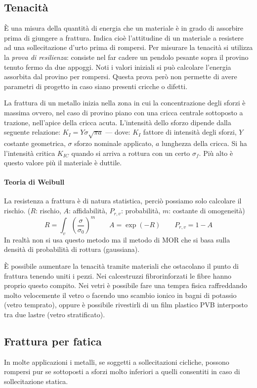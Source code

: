 \documentclass[a5paper,12pt]{article}
\newcommand{\e}{\`E\xspace}  %
\begin{document}
\subsection{Tenacità}
\e una misura della quantità di energia che un materiale è in grado di assorbire prima di giungere a frattura. Indica cioè l'attitudine di un materiale a resistere ad 	una sollecitazione d'urto prima di rompersi. Per misurare la tenacità si utilizza la \emph{prova di resilienza}: consiste nel far cadere un pendolo pesante sopra il provino tenuto fermo da due appoggi. Noti i valori iniziali si può calcolare l'energia assorbita dal provino per rompersi. Questa prova però non permette di avere parametri di progetto in caso siano presenti cricche o difetti. 

La frattura di un metallo inizia nella zona in cui la concentrazione degli sforzi è massima ovvero, nel caso di provino piano con una cricca centrale sottoposto a trazione, nell'apice della cricca acuta. L'intensità dello sforzo dipende dalla seguente relazione: $K_I = Y \sigma \sqrt{\pi a} $ --- dove: $K_I$ fattore di intensità degli sforzi, $Y$ costante geometrica, $\sigma$ sforzo nominale applicato, $a$ lunghezza della cricca. Si ha l'intensità critica $K_{IC}$ quando si arriva a rottura con un certo $\sigma_f$. 
Più alto è questo valore più il materiale è duttile.
\paragraph{Teoria di Weibull}
La resistenza a frattura è di natura statistica, perciò possiamo solo calcolare il rischio. ($R$: rischio, $A$: affidabilità, $P_{r,v}$: probabilità, $m$: costante di omogeneità)
\[R=\int_v{\left(\frac{\sigma}{\sigma_0}\right)^m} \qquad A=\exp(-R) \qquad P_{r,v}=1-A\]
In realtà non si usa questo metodo ma il metodo di MOR che si basa sulla densità di probabilità di rottura (gaussiana).

\e possibile aumentare la tenacità tramite materiali che ostacolano il punto di frattura tenendo uniti i pezzi. Nei calcestruzzi fibrorinforzati le fibre hanno proprio questo compito. Nei vetri è possibile fare una tempra fisica raffreddando molto velocemente il vetro o facendo uno scambio ionico in bagni di potassio (vetro temprato), oppure è possibile rivestirli di un film plastico PVB interposto tra due lastre (vetro stratificato).
\subsection{Frattura per fatica}
In molte applicazioni i metalli, se soggetti a sollecitazioni cicliche, possono rompersi pur se sottoposti a sforzi molto inferiori a quelli consentiti in caso di sollecitazione statica.
\end{document}
